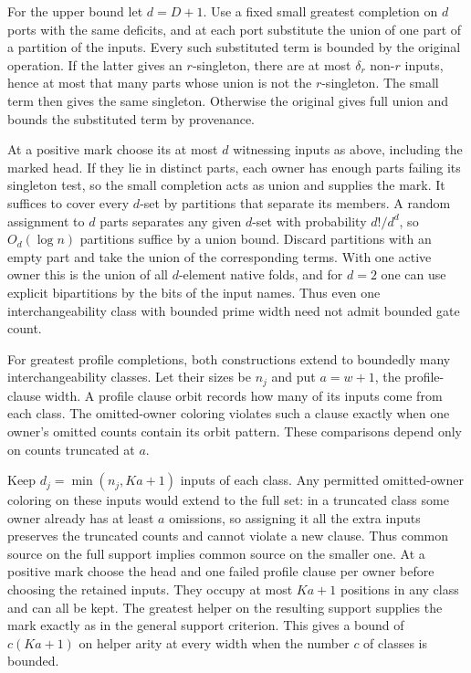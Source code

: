 For the upper bound let $d=D+1$. Use a fixed small greatest
completion on $d$ ports with the same deficits, and at
each port substitute the union of one part of a partition
of the inputs. Every such substituted term is bounded by
the original operation. If the latter gives an $r$-singleton,
there are at most $\delta_r$ non-$r$ inputs, hence at most
that many parts whose union is not the $r$-singleton.
The small term then gives the same singleton. Otherwise
the original gives full union and bounds the substituted
term by provenance.

At a positive mark choose its at most $d$ witnessing inputs
as above, including the marked head. If they lie in distinct
parts, each owner has enough parts failing its singleton
test, so the small completion acts as union and supplies
the mark. It suffices to cover every $d$-set by partitions
that separate its members. A random assignment to $d$
parts separates any given $d$-set with probability $d!/d^d$,
so $O_d(\log n)$ partitions suffice by a union bound.
Discard partitions with an empty part and take the union
of the corresponding terms. With one active owner this
is the union of all $d$-element native folds, and for $d=2$
one can use explicit bipartitions by the bits of the input
names. Thus even one interchangeability class with bounded
prime width need not admit bounded gate count.

For greatest profile completions, both constructions extend
to boundedly many interchangeability classes. Let their
sizes be $n_j$ and put $a=w+1$, the profile-clause width.
A profile clause orbit records how many of its inputs
come from each class. The omitted-owner coloring violates
such a clause exactly when one owner's omitted counts
contain its orbit pattern. These comparisons depend only
on counts truncated at $a$.

Keep $d_j=\min(n_j,Ka+1)$ inputs of each class. Any permitted
omitted-owner coloring on these inputs would extend to
the full set: in a truncated class some owner already has
at least $a$ omissions, so assigning it all the extra inputs
preserves the truncated counts and cannot violate a new
clause. Thus common source on the full support implies
common source on the smaller one. At a positive mark choose
the head and one failed profile clause per owner before
choosing the retained inputs. They occupy at most $Ka+1$
positions in any class and can all be kept. The greatest
helper on the resulting support supplies the mark exactly
as in the general support criterion. This gives a bound of
$c(Ka+1)$ on helper arity at every width when the number
$c$ of classes is bounded.

